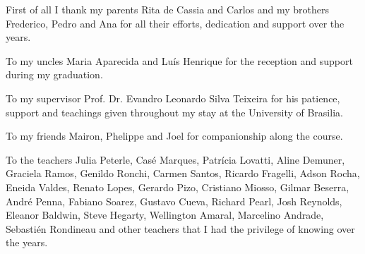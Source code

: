 \begin{agradecimentos}
First of all I thank my parents Rita de Cassia and Carlos and my brothers Frederico, Pedro and Ana for all their efforts, dedication and support over the years.
\par
To my uncles Maria Aparecida and Luís Henrique for the reception and support during my graduation.
\par
To my supervisor Prof. Dr. Evandro Leonardo Silva Teixeira for his patience, support and teachings given throughout my stay at the University of Brasilia.
\par
To my friends Mairon, Phelippe and Joel for companionship along the course.
\par
To the teachers Julia Peterle, Casé Marques, Patrícia Lovatti, Aline Demuner, Graciela Ramos, Genildo Ronchi, Carmen Santos, Ricardo Fragelli, Adson Rocha, Eneida Valdes, Renato Lopes, Gerardo Pizo, Cristiano Miosso, Gilmar Beserra, André Penna, Fabiano Soarez, Gustavo Cueva, Richard Pearl, Josh Reynolds, Eleanor Baldwin, Steve Hegarty, Wellington Amaral, Marcelino Andrade, Sebastién Rondineau and other teachers that I had the privilege of knowing over the years.
\end{agradecimentos}

